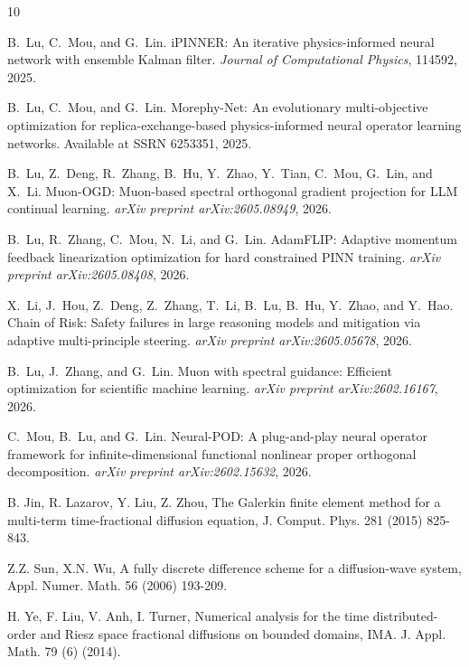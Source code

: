 \documentclass[11pt]{article}
\begin{document}
\begin{thebibliography}{10}
\begin{footnotesize}
B.~Lu, C.~Mou, and G.~Lin.
\newblock iPINNER: An iterative physics-informed neural network with ensemble Kalman filter.
\newblock \emph{Journal of Computational Physics}, 114592, 2025.

B.~Lu, C.~Mou, and G.~Lin.
\newblock Morephy-Net: An evolutionary multi-objective optimization for replica-exchange-based physics-informed neural operator learning networks.
\newblock Available at SSRN 6253351, 2025.

B.~Lu, Z.~Deng, R.~Zhang, B.~Hu, Y.~Zhao, Y.~Tian, C.~Mou, G.~Lin, and X.~Li.
\newblock Muon-OGD: Muon-based spectral orthogonal gradient projection for LLM continual learning.
\newblock \emph{arXiv preprint arXiv:2605.08949}, 2026.

B.~Lu, R.~Zhang, C.~Mou, N.~Li, and G.~Lin.
\newblock AdamFLIP: Adaptive momentum feedback linearization optimization for hard constrained PINN training.
\newblock \emph{arXiv preprint arXiv:2605.08408}, 2026.

X.~Li, J.~Hou, Z.~Deng, Z.~Zhang, T.~Li, B.~Lu, B.~Hu, Y.~Zhao, and Y.~Hao.
\newblock Chain of Risk: Safety failures in large reasoning models and mitigation via adaptive multi-principle steering.
\newblock \emph{arXiv preprint arXiv:2605.05678}, 2026.

B.~Lu, J.~Zhang, and G.~Lin.
\newblock Muon with spectral guidance: Efficient optimization for scientific machine learning.
\newblock \emph{arXiv preprint arXiv:2602.16167}, 2026.

C.~Mou, B.~Lu, and G.~Lin.
\newblock Neural-POD: A plug-and-play neural operator framework for infinite-dimensional functional nonlinear proper orthogonal decomposition.
\newblock \emph{arXiv preprint arXiv:2602.15632}, 2026.


B. Jin, R. Lazarov, Y. Liu, Z. Zhou,  The Galerkin finite element method for a multi-term time-fractional diffusion equation, J. Comput. Phys. 281 (2015) 825-843.



 Z.Z. Sun, X.N. Wu, A fully discrete difference scheme for a diffusion-wave system, Appl. Numer. Math. 56 (2006) 193-209.

H. Ye,  F. Liu,  V. Anh,  I. Turner,   Numerical analysis for the time distributed-order and Riesz space fractional diffusions on bounded domains, IMA. J. Appl. Math. 79 (6) (2014).


\end{footnotesize}
\end{thebibliography}
\end{document}
